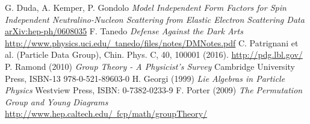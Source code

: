 \begin{thebibliography}{xxx}
 G. Duda, A. Kemper, P. Gondolo \textit{Model Independent Form Factors for Spin Independent Neutralino-Nucleon Scattering from Elastic Electron Scattering Data} \href{https://arxiv.org/abs/hep-ph/0608035v2}{arXiv:hep-ph/0608035}
 F. Tanedo \textit{Defense Against the Dark Arts}\\ \href{http://www.physics.uci.edu/~tanedo/files/notes/DMNotes.pdf}{http://www.physics.uci.edu/~tanedo/files/notes/DMNotes.pdf}
 C. Patrignani et al. (Particle Data Group), Chin. Phys. C, 40, 100001 (2016). \href{http://pdg.lbl.gov/}{http://pdg.lbl.gov/}
 P. Ramond (2010) \textit{Group Theory - A Physicist's Survey} Cambridge University Press, ISBN-13 978-0-521-89603-0 
 H. Georgi (1999) \textit{Lie Algebras in Particle Physics} Westview Press, ISBN: 0-7382-0233-9
 F. Porter (2009) \textit{The Permutation Group and Young Diagrams} \href{http://www.hep.caltech.edu/~fcp/math/groupTheory/}{http://www.hep.caltech.edu/~fcp/math/groupTheory/}
\end{thebibliography}